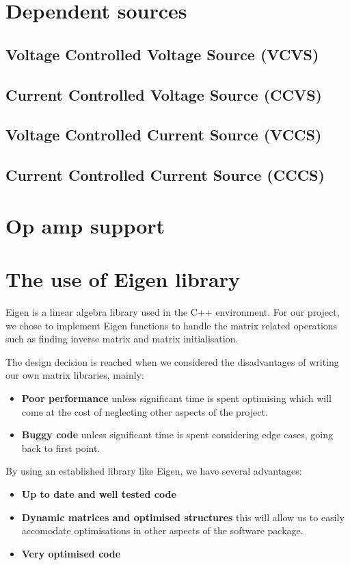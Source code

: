 \documentclass[a4paper, titlepage]{article}
\begin{document}
   
    \pagebreak

    \section{Dependent sources}
    \subsection{Voltage Controlled Voltage Source (VCVS)}
    \subsection{Current Controlled Voltage Source (CCVS)}
    \subsection{Voltage Controlled Current Source (VCCS)}
    \subsection{Current Controlled Current Source (CCCS)}
    \pagebreak

    \section{Op amp support}
    \pagebreak
    \section{The use of Eigen library}
    Eigen is a linear algebra library used in the C++ environment. For our project, we chose to implement 
    Eigen functions to handle the matrix related operations such as finding inverse matrix 
    and matrix initialisation.
    \par
    The design decision is reached when we considered
    the disadvantages of writing our own matrix libraries, mainly:
    \begin{itemize}
        \item \textbf{Poor performance} unless significant time is spent optimising which will come at the cost of
        neglecting other aspects of the project.
        \item \textbf{Buggy code} unless significant time is spent considering edge cases, going back to first point.
    \end{itemize}
    By using an established library like Eigen, we have several advantages:
    \begin{itemize}
        \item \textbf{Up to date and well tested code}
        \item \textbf{Dynamic matrices and optimised structures} this will allow us to easily accomodate  
        optimisations in other aspects of the software package.
        \item \textbf{Very optimised code}

    \end{itemize}
    \pagebreak
\end{document}
